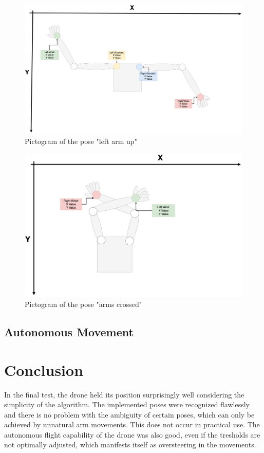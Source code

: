 \documentclass[a4paper,11pt,singlespacing]{article}
\begin{document}
\begin{figure}[H]
	\centering
	\includegraphics[width=\textwidth]{images/left_arm_up.png}
	\caption{Pictogram of the pose "left arm up"}
	\label{left_arm_up}
\end{figure}

\begin{figure}[H]
	\centering
	\includegraphics[width=\textwidth]{images/arms_crossed.png}
	\caption{Pictogram of the pose "arms crossed"}
	\label{arms_crossed}
\end{figure}
\subsection{Autonomous Movement}


\pagebreak
\section{Conclusion}
In the final test, the drone held its position surprisingly well considering the simplicity of the algorithm.
The implemented poses were recognized flawlessly and there is no problem with the ambiguity of certain poses, which can only be achieved by unnatural arm movements.
This does not occur in practical use.
The autonomous flight capability of the drone was also good, even if the tresholds are not optimally adjusted, which manifests itself as oversteering in the movements.
\end{document}

